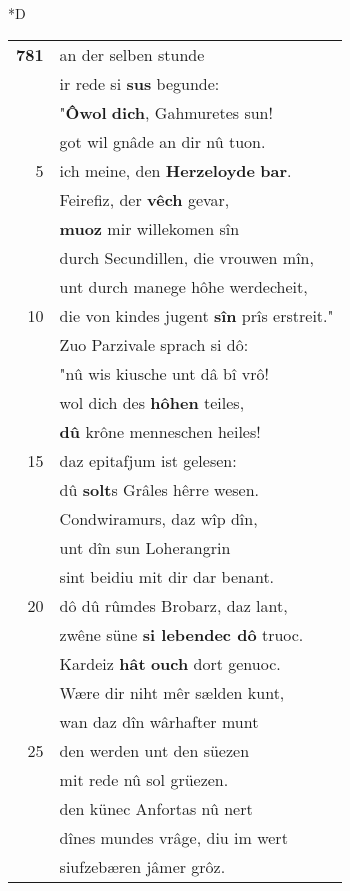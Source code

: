 \documentclass[8pt,a4paper,notitlepage]{article}
\begin{document}
\begin{table}[ht]
\begin{minipage}[t]{0.5\linewidth}
\small
\begin{center}*D
\end{center}
\begin{tabular}{rl}
\textbf{781} & an der selben stunde\\ 
 & ir rede si \textbf{sus} begunde:\\ 
 & "\textbf{Ôwol} \textbf{dich}, Gahmuretes sun!\\ 
 & got wil gnâde an dir nû tuon.\\ 
5 & ich meine, den \textbf{Herzeloyde} \textbf{bar}.\\ 
 & Feirefiz, der \textbf{vêch} gevar,\\ 
 & \textbf{muoz} mir willekomen sîn\\ 
 & durch Secundillen, die vrouwen mîn,\\ 
 & unt durch manege hôhe werdecheit,\\ 
10 & die von kindes jugent \textbf{sîn} prîs erstreit."\\ 
 & Zuo Parzivale sprach si dô:\\ 
 & "nû wis kiusche unt dâ bî vrô!\\ 
 & wol dich des \textbf{hôhen} teiles,\\ 
 & \textbf{dû} krône menneschen heiles!\\ 
15 & daz epitafjum ist gelesen:\\ 
 & dû \textbf{solt}s Grâles hêrre wesen.\\ 
 & Condwiramurs, daz wîp dîn,\\ 
 & unt dîn sun Loherangrin\\ 
 & sint beidiu mit dir dar benant.\\ 
20 & dô dû rûmdes Brobarz, daz lant,\\ 
 & zwêne süne \textbf{si lebendec dô} truoc.\\ 
 & Kardeiz \textbf{hât} \textbf{ouch} dort genuoc.\\ 
 & Wære dir niht mêr sælden kunt,\\ 
 & wan daz dîn wârhafter munt\\ 
25 & den werden unt den süezen\\ 
 & mit rede nû sol grüezen.\\ 
 & den künec Anfortas nû nert\\ 
 & dînes mundes vrâge, diu im wert\\ 
 & siufzebæren jâmer grôz.\\ 

\end{tabular}
\end{minipage}
\end{table}
\end{document}
